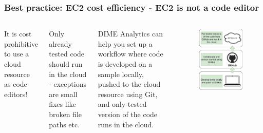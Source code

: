 \documentclass[aspectratio=169]{beamer} %
\begin{document}
\begin{frame}
	\frametitle{Best practice: EC2 cost efficiency - EC2 is not a code editor}

	\begin{columns}[c]

		It is cost prohibitive to use a cloud resource as code editors!

		\vspace{.5cm}

		Only already tested code should run in the cloud
		- exceptions are small fixes like broken file paths etc.

		\vspace{.5cm}

		DIME Analytics can help you set up a workflow
		where code is developed on a sample locally, 
		pushed to the cloud resource using Git,
		and only tested version of the code runs in the cloud.

		\begin{figure}
			\centering
			\includegraphics[width=.8\textwidth]{./img/code-workflow.png}
		\end{figure}
	\end{columns}
\end{frame}
\end{document}
